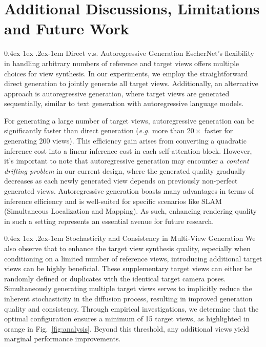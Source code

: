\documentclass[10pt,twocolumn,letterpaper]{article}
\makeatletter
\renewcommand{\paragraph}{%
  \@startsection{paragraph}{4}%
  {\z@}{0.4ex \@plus 1ex \@minus .2ex}{-1em}%
  {\normalfont\normalsize\bfseries}%
}
\makeatother
\begin{document}
\newpage
\section{Additional Discussions, Limitations and Future Work}
\label{app:discussions}

\paragraph{Direct v.s. Autoregressive Generation} 
EscherNet's flexibility in handling arbitrary numbers of reference and target views offers multiple choices for view synthesis. In our experiments, we employ the straightforward direct generation to jointly generate all target views. Additionally, an alternative approach is autoregressive generation, where target views are generated sequentially, similar to text generation with autoregressive language models.

For generating a large number of target views, autoregressive generation can be significantly faster than direct generation ({\it e.g.} more than $20\times$ faster for generating 200 views). This efficiency gain arises from converting a quadratic inference cost into a linear inference cost in each self-attention block. However, it's important to note that autoregressive generation may encounter a {\it content drifting problem} in our current design, where the generated quality gradually decreases as each newly generated view depends on previously non-perfect generated views. Autoregressive generation boasts many advantages in terms of inference efficiency and is well-suited for specific scenarios like SLAM (Simultaneous Localization and Mapping). As such, enhancing rendering quality in such a setting represents an essential avenue for future research.


\paragraph{Stochasticity and Consistency in Multi-View Generation} 
We also observe that to enhance the target view synthesis quality, especially when conditioning on a limited number of reference views, introducing additional target views can be highly beneficial. These supplementary target views can either be randomly defined or duplicates with the identical target camera poses. Simultaneously generating multiple target views serves to implicitly reduce the inherent stochasticity in the diffusion process, resulting in improved generation quality and consistency. Through empirical investigations, we determine that the optimal configuration ensures a minimum of 15 target views, as highlighted in orange in Fig.~\ref{fig:analysis}. Beyond this threshold, any additional views yield marginal performance improvements.
\end{document}
